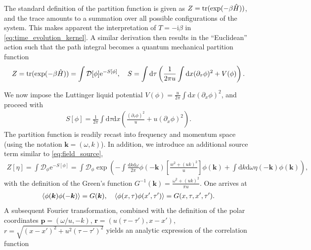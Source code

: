 \documentclass{svmono}
\def\ri{\mathrm i}
\def\re{\mathrm e}
\def\rd{\mathrm d}
\def\rD{\mathcal D}
\def\tr{{\rm tr}}
\newcommand{\commutator}[1]{\left[ #1 \right]}
\newcommand{\brlr}[1]{\left( #1 \right)}
\providecommand{\DIFdelbegin}{} %
\newcommand{\DIFscaledelfig}{0.5}
\newlength{\DIFdelgraphicswidth} %
\newlength{\DIFdelgraphicsheight} %
\newcommand{\DIFdelincludegraphics}[2][]{%
\sbox{\DIFdelgraphicsbox}{\DIFOincludegraphics[#1]{#2}}%
\settoboxwidth{\DIFdelgraphicswidth}{\DIFdelgraphicsbox} %
\settoboxtotalheight{\DIFdelgraphicsheight}{\DIFdelgraphicsbox} %
\scalebox{\DIFscaledelfig}{%
\parbox[b]{\DIFdelgraphicswidth}{\usebox{\DIFdelgraphicsbox}\\[-\baselineskip] \rule{\DIFdelgraphicswidth}{0em}}\llap{\resizebox{\DIFdelgraphicswidth}{\DIFdelgraphicsheight}{%
\setlength{\unitlength}{\DIFdelgraphicswidth}%
\begin{picture}(1,1)%
\thicklines\linethickness{2pt} %
{\color[rgb]{1,0,0}\put(0,0){\framebox(1,1){}}}%
{\color[rgb]{1,0,0}\put(0,0){\line( 1,1){1}}}%
{\color[rgb]{1,0,0}\put(0,1){\line(1,-1){1}}}%
\end{picture}%
}\hspace*{3pt}}} %
} %
\DeclareRobustCommand{\DIFdelbegin}{\DIFOdelbegin \let\includegraphics\DIFdelincludegraphics} %
\begin{document}
The standard definition of the partition function is given as $Z=\tr(\exp(-\beta \hat H))$, and the trace amounts to a summation over all possible configurations of the system.
This makes apparent the interpretation of $T=-\ri \beta$ in \cref{eq:time_evolution_kernel}.
A similar derivation then results in the ``Euclidean'' action such that the path integral becomes a quantum mechanical partition function
\begin{align}
    Z = \tr(\exp(-\beta \hat H)) = \int\rD[\phi]\re^{-S[\phi]}
    ,\quad
    S = \int\rd\tau\brlr{\frac1{2\pi u}\int\rd x(\partial_\tau\phi)^2+V(\phi)}.
\end{align}

We now impose the Luttinger liquid potential $V(\phi) = \frac u{2\pi}\int\rd x(\partial_x\phi)^2$, and proceed with
\begin{align}
    S[\phi]=\frac1{2\pi}\int\rd\tau\rd x\brlr{ \frac{(\partial_\tau\phi)^2}{u} + u(\partial_x\phi)^2}.
\end{align}
The partition function is readily recast into frequency and momentum space (using the notation ${\bm k}=(\omega, k)$).
In addition, we introduce an additional source term similar to \cref{eq:field_source},
\begin{align}
    Z[\eta] = \int\rD_\phi \re^{-S[\phi]} = \int\rD_\phi \exp\brlr{-\int\frac{\rd k\rd\omega}{2\pi}\phi(-{\bm k})\commutator{\frac{w^2+(uk)^2}{u}}\phi({\bm k}) +\int\rd k\rd\omega\eta(-{\bm k})\phi({\bm k})},
    \label{eq:full_partition_function}
\end{align}
with the definition of the Green's function $G^{-1}({\bm k})=\frac{\omega^2+(uk)^2}{\pi u}$.
One arrives at
\begin{align}
    \braket{\phi({\bm k})\phi(-{\bm k})} = G({\bm k})
    ,\quad
    \braket{\phi(x,\tau)\phi(x',\tau')} = G(x,\tau,x',\tau').
    \label{eq:KG_greens_functions_equality}
\end{align}
A subsequent Fourier transformation, combined with the definition of the polar coordinates ${\bm p}=(\omega/u,-k)$, ${\bm r} = (u(\tau-\tau'), x-x')$, $r = \sqrt{(x-x')^2+u^2(\tau-\tau')^2}$ yields an analytic expression of the correlation function
\DIFdelbegin %
\end{document}
